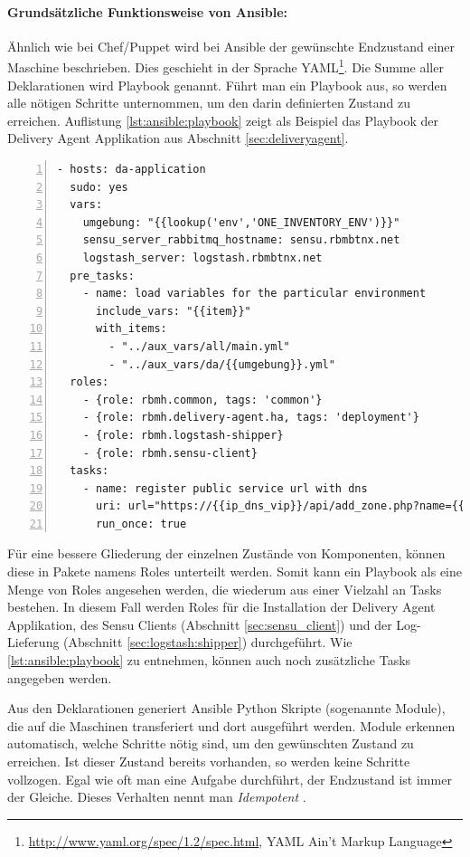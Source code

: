 \paragraph{Grundsätzliche Funktionsweise von Ansible:} 
Ähnlich wie bei Chef/Puppet wird bei Ansible der gewünschte Endzustand einer Maschine beschrieben. Dies geschieht in der Sprache YAML\footnote{\url{http://www.yaml.org/spec/1.2/spec.html}, YAML Ain’t Markup Language}. Die Summe aller Deklarationen wird Playbook genannt. Führt man ein Playbook aus, so werden alle nötigen Schritte unternommen, um den darin definierten Zustand zu erreichen. Auflistung \ref{lst:ansible:playbook} zeigt als Beispiel das Playbook der Delivery Agent Applikation aus Abschnitt \ref{sec:deliveryagent}.

\begin{lstlisting}[style=code,numbers=left,caption={Beispiel: Ansible Playbook des Delivery Agents},label={lst:ansible:playbook}]
- hosts: da-application
  sudo: yes
  vars:
    umgebung: "{{lookup('env','ONE_INVENTORY_ENV')}}"
    sensu_server_rabbitmq_hostname: sensu.rbmbtnx.net
    logstash_server: logstash.rbmbtnx.net
  pre_tasks:
    - name: load variables for the particular environment
      include_vars: "{{item}}"
      with_items:
        - "../aux_vars/all/main.yml"
        - "../aux_vars/da/{{umgebung}}.yml"
  roles:
    - {role: rbmh.common, tags: 'common'}
    - {role: rbmh.delivery-agent.ha, tags: 'deployment'}
    - {role: rbmh.logstash-shipper}
    - {role: rbmh.sensu-client}
  tasks:
    - name: register public service url with dns
      uri: url="https://{{ip_dns_vip}}/api/add_zone.php?name={{public_service_uri}}&ext={{keepalived_shared_ip}}&int={{keepalived_shared_ip}}&typ=nosite&id=8dfk38sdERe8sdA923n" 
      run_once: true
\end{lstlisting}

Für eine bessere Gliederung der einzelnen Zustände von Komponenten, können diese in Pakete namens Roles unterteilt werden. Somit kann ein Playbook als eine Menge von Roles angesehen werden, die wiederum aus einer Vielzahl an Tasks bestehen. In diesem Fall werden Roles für die Installation der Delivery Agent Applikation, des Sensu Clients (Abschnitt \ref{sec:sensu_client}) und der Log-Lieferung (Abschnitt \ref{sec:logstash:shipper}) durchgeführt. Wie \autoref{lst:ansible:playbook} zu entnehmen, können auch noch zusätzliche Tasks angegeben werden.

Aus den Deklarationen generiert Ansible Python Skripte (sogenannte Module), die auf die Maschinen transferiert und dort ausgeführt werden. Module erkennen automatisch, welche Schritte nötig sind, um den gewünschten Zustand zu erreichen. Ist dieser Zustand bereits vorhanden, so werden keine Schritte vollzogen. Egal wie oft man eine Aufgabe durchführt, der Endzustand ist immer der Gleiche. Dieses Verhalten nennt man \textit{Idempotent} \cite{hall2013}.

